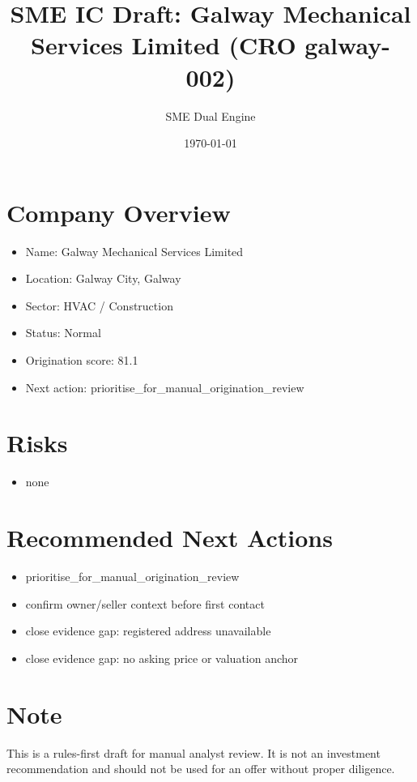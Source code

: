 \documentclass[11pt,a4paper]{article}
\title{SME IC Draft: Galway Mechanical Services Limited (CRO galway-002)}
\author{SME Dual Engine}
\date{\today}
\begin{document}
\maketitle
\section*{Company Overview}
\begin{itemize}[leftmargin=1.4em]
\item Name: Galway Mechanical Services Limited
\item Location: Galway City, Galway
\item Sector: HVAC / Construction
\item Status: Normal
\item Origination score: 81.1
\item Next action: prioritise\_for\_manual\_origination\_review
\end{itemize}
\section*{Risks}
\begin{itemize}[leftmargin=1.4em]
\item none
\end{itemize}
\section*{Recommended Next Actions}
\begin{itemize}[leftmargin=1.4em]
\item prioritise\_for\_manual\_origination\_review
\item confirm owner/seller context before first contact
\item close evidence gap: registered address unavailable
\item close evidence gap: no asking price or valuation anchor
\end{itemize}
\section*{Note}
This is a rules-first draft for manual analyst review. It is not an investment
recommendation and should not be used for an offer without proper diligence.
\end{document}
